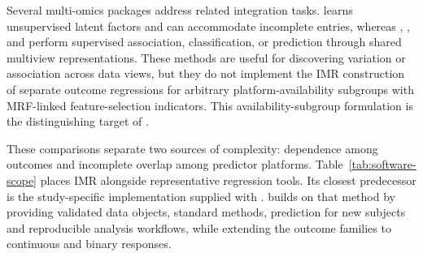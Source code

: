 \documentclass[article]{jss}
\begin{document}
Several multi-omics packages address related integration tasks. 
\citep{argelaguet2018} learns unsupervised latent factors and can accommodate
incomplete entries, whereas  \citep{chekouo2023bipnet},
 \citep{safo2022sida}, and 
\citep{safo2025rand} perform supervised association, classification, or
prediction through shared multiview representations. These methods are useful
for discovering variation or association across data views, but they do not
implement the IMR construction of separate outcome regressions for arbitrary
platform-availability subgroups with MRF-linked feature-selection indicators.
This availability-subgroup formulation is the distinguishing target of
.

These comparisons separate two sources of complexity: dependence among outcomes
and incomplete overlap among predictor platforms. Table~\ref{tab:software-scope}
places IMR alongside representative regression tools. Its closest predecessor
is the study-specific  implementation supplied with
\citet{chekouo2017}.  builds on that method by providing
validated data objects, standard  methods, prediction for new
subjects and reproducible analysis workflows, while extending the outcome
families to continuous and binary responses.
\end{document}
